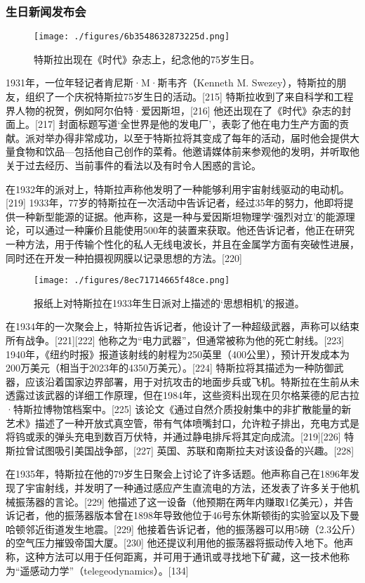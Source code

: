 \subsubsection{生日新闻发布会}
\begin{figure}[ht]
\centering
\texttt{[image: ./figures/6b3548632873225d.png]}
\caption{特斯拉出现在《时代》杂志上，纪念他的75岁生日。} \label{fig_Tesla_19}
\end{figure}
1931年，一位年轻记者肯尼斯·M·斯韦齐（Kenneth M. Swezey），特斯拉的朋友，组织了一个庆祝特斯拉75岁生日的活动。[215] 特斯拉收到了来自科学和工程界人物的祝贺，例如阿尔伯特·爱因斯坦，[216] 他还出现在了《时代》杂志的封面上。[217] 封面标题写道‘全世界是他的发电厂’，表彰了他在电力生产方面的贡献。派对举办得非常成功，以至于特斯拉将其变成了每年的活动，届时他会提供大量食物和饮品—包括他自己创作的菜肴。他邀请媒体前来参观他的发明，并听取他关于过去经历、当前事件的看法以及有时令人困惑的言论。

在1932年的派对上，特斯拉声称他发明了一种能够利用宇宙射线驱动的电动机。[219] 1933年，77岁的特斯拉在一次活动中告诉记者，经过35年的努力，他即将提供一种新型能源的证据。他声称，这是一种与爱因斯坦物理学‘强烈对立’的能源理论，可以通过一种廉价且能使用500年的装置来获取。他还告诉记者，他正在研究一种方法，用于传输个性化的私人无线电波长，并且在金属学方面有突破性进展，同时还在开发一种拍摄视网膜以记录思想的方法。[220]
\begin{figure}[ht]
\centering
\texttt{[image: ./figures/8ec71714665f48ce.png]}
\caption{报纸上对特斯拉在1933年生日派对上描述的‘思想相机’的报道。} \label{fig_Tesla_20}
\end{figure}
在1934年的一次聚会上，特斯拉告诉记者，他设计了一种超级武器，声称可以结束所有战争。[221][222] 他称之为“电力武器”，但通常被称为他的死亡射线。[223] 1940年，《纽约时报》报道该射线的射程为250英里（400公里），预计开发成本为200万美元（相当于2023年的4350万美元）。[224] 特斯拉将其描述为一种防御武器，应该沿着国家边界部署，用于对抗攻击的地面步兵或飞机。特斯拉在生前从未透露过该武器的详细工作原理，但在1984年，这些资料出现在贝尔格莱德的尼古拉·特斯拉博物馆档案中。[225] 该论文《通过自然介质投射集中的非扩散能量的新艺术》描述了一种开放式真空管，带有气体喷嘴封口，允许粒子排出，充电方式是将钨或汞的弹头充电到数百万伏特，并通过静电排斥将其定向成流。[219][226] 特斯拉曾试图吸引美国战争部，[227] 英国、苏联和南斯拉夫对该设备的兴趣。[228]

在1935年，特斯拉在他的79岁生日聚会上讨论了许多话题。他声称自己在1896年发现了宇宙射线，并发明了一种通过感应产生直流电的方法，还发表了许多关于他机械振荡器的言论。[229] 他描述了这一设备（他预期在两年内赚取1亿美元），并告诉记者，他的振荡器版本曾在1898年导致他位于46号东休斯顿街的实验室以及下曼哈顿邻近街道发生地震。[229] 他接着告诉记者，他的振荡器可以用5磅（2.3公斤）的空气压力摧毁帝国大厦。[230] 他还提议利用他的振荡器将振动传入地下。他声称，这种方法可以用于任何距离，并可用于通讯或寻找地下矿藏，这一技术他称为“遥感动力学”（telegeodynamics）。[134]

